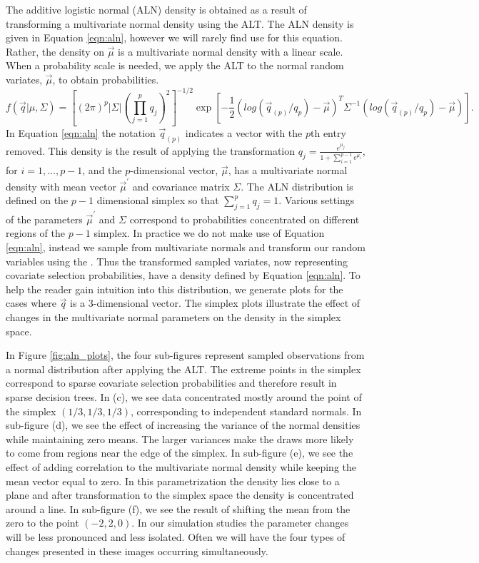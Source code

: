 	The additive logistic normal (ALN) density is obtained as a result of transforming a multivariate normal density using the ALT. The ALN density is given in Equation \ref{eqn:aln}, however we will rarely find use for this equation. Rather, the density on $\vec{\mu}$ is a multivariate normal density with a linear scale. When a probability scale is needed, we apply the ALT to the normal random variates, $\vec{\mu}$, to obtain probabilities. 	
\begin{equation}\label{eqn:aln}
f(\vec{q}\vert \mu, \Sigma) = \left[(2\pi)^p\vert\Sigma\vert\left(\prod_{j=1}^{p}q_j\right)^2\right]^{-1/2}\exp\left[ -\frac{1}{2}(log(\vec{q}_{(p)}/q_{p}) - \vec{\mu})^T \Sigma^{-1}(log(\vec{q}_{(p)}/q_{p}) - \vec{\mu}) \right].
\end{equation} 
In Equation \ref{eqn:aln} the notation $\vec{q}_{(p)}$ indicates a vector with the $p$th entry removed. This density is the result of applying the transformation $q_j = \frac{e^{\mu_j}}{1+\sum_{i=1}^{p-1}e^{\mu_i}}$, for $i=1,\dots,p-1$, and the $p$-dimensional vector, $\vec{\mu}$, has a multivariate normal density with mean vector $\vec{\mu}^\prime$ and covariance matrix $\Sigma$. 
The ALN distribution is defined on the $p-1$ dimensional simplex so that $\sum_{j=1}^{p}q_j =1$. Various settings of the parameters $\vec{\mu}^\prime$ and $\Sigma$ correspond to probabilities concentrated on different regions of the $p-1$ simplex. In practice we do not make use of Equation \ref{eqn:aln}, instead we sample from multivariate normals and transform our random variables using the \ALT. Thus the transformed sampled variates, now representing covariate selection probabilities, have a density defined by Equation \ref{eqn:aln}. To help the reader gain intuition into this distribution, we generate plots for the cases where $\vec{q}$ is a $3$-dimensional vector. The simplex plots illustrate the effect of changes in the multivariate normal parameters on the density in the simplex space. 

In Figure \ref{fig:aln_plots}, the four sub-figures represent sampled observations from a normal distribution after applying the ALT. The extreme points in the simplex correspond to sparse covariate selection probabilities and therefore result in sparse decision trees. In (c), we see data concentrated mostly around the point of the simplex $(1/3,1/3,1/3)$, corresponding to independent standard normals. In sub-figure (d), we see the effect of increasing the variance of the normal densities while maintaining zero means. The larger variances make the draws more likely to come from regions near the edge of the simplex.  In sub-figure (e), we see the effect of adding correlation to the multivariate normal density while keeping the mean vector equal to zero. In this parametrization the density lies close to a plane and after transformation to the simplex space the density is concentrated around a line. In sub-figure (f), we see the result of shifting the mean from the zero to the point $(-2,2,0)$. In our simulation studies the parameter changes will be less pronounced and less isolated. Often we will have the four types of changes presented in these images occurring simultaneously. 

